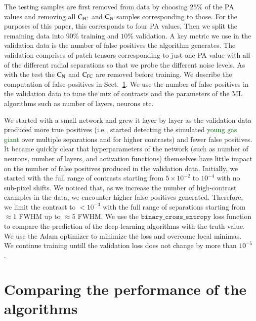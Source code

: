 \documentclass{aa}
\newcommand{\newchange}[1]{\textcolor{darkgreen}{#1}}
\begin{document}
The testing samples are first removed from data by choosing $25\%$ of the PA values and removing all $\rm{C_{FC}}$ and $\rm{C_N}$ samples corresponding to those. 
For the purposes of this paper, this corresponds to four PA values.
Then we split the remaining data into $90\%$ training and $10\%$ validation.
A key metric we use in the validation data is the number of false positives the algorithm generates. 
The validation comprises of patch tensors corresponding to just one PA value with all of the different radial separations so that we probe the different noise levels.
As with the test the $\rm{C_N}$ and $\rm{C_{FC}}$ are removed before training.
We describe the computation of false positives in Sect.~\ref{sec:results}.
We use the number of false positives in the validation data to tune the mix of contrasts and the parameters of the ML algorithms such as number of layers, neurons etc.

We started with a small network and grew it layer by layer as the validation data produced more true positives (i.e., started detecting the simulated \newchange{young gas giant} over multiple separations and for higher contrasts) and fewer false positives.
It became quickly clear that hyperparameters of the network (such as number of neurons, number of layers, and activation functions) themselves have little impact on the number of false positives produced in the validation data.
Initially, we started with the full range of contrasts starting from $5\times10^{-2}$ to $10^{-4}$ with no sub-pixel shifts.
We noticed that, as we increase the number of high-contrast examples in the data, we encounter higher false positives generated. Therefore, we limit the contrast to $<10^{-3}$ with the full range of separations starting from $\approx 1$ FWHM up to $\approx 5$ FWHM.
We use the $\texttt{binary\_cross\_entropy}$ loss function \citep{1993Li} to compare the prediction of the deep-learning algorithms with the truth value.
We use the Adam optimizer \citep{2014Adam} to minimize the loss and overcome local minimas.
We continue training untill the validation loss does not change by more than $10^{-5}$.



\section{Comparing the performance of the algorithms}\label{sec:results}
\end{document}
